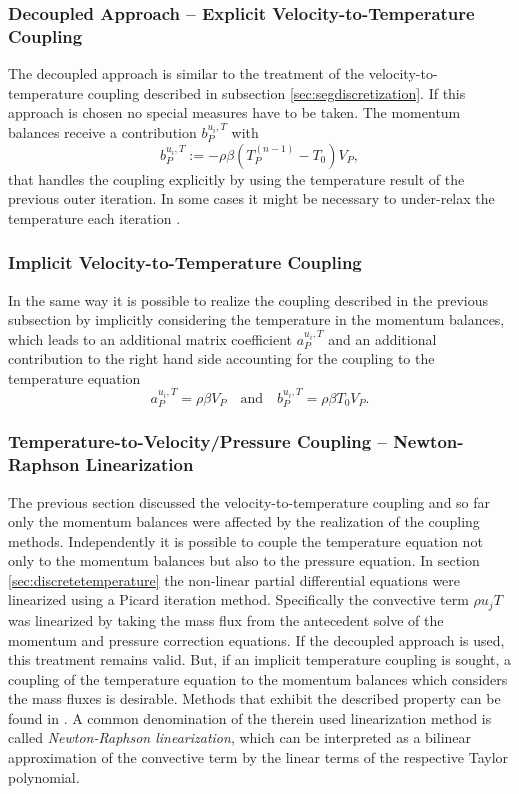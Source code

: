 \subsubsection{Decoupled Approach -- Explicit Velocity-to-Temperature Coupling}

The decoupled approach is similar to the treatment of the velocity-to-temperature coupling described in subsection \ref{sec:segdiscretization}. If this approach is chosen no special measures have to be taken. The momentum balances receive a contribution \( b_P^{u_i,T}\) with
\begin{displaymath}
  b_P^{u_i,T} := - \rho \beta \left( T_P^{(n-1)} - T_0 \right) V_P,
\end{displaymath}
that handles the coupling explicitly by using the temperature result of the previous outer iteration. In some cases it might be necessary to under-relax the temperature each iteration \cite{ferziger02}.

\subsubsection{Implicit Velocity-to-Temperature Coupling}

In the same way it is possible to realize the coupling described in the previous subsection by implicitly considering the temperature in the momentum balances, which leads to an additional matrix coefficient \(a_P^{u_i,T}\) and an additional contribution to the right hand side accounting for the coupling to the temperature equation
\begin{displaymath}
  a_P^{u_i,T} = \rho \beta V_P 
  \quad \text{and} \quad
  b_P^{u_i,T} = \rho \beta T_0 V_P.
\end{displaymath}

\subsubsection{Temperature-to-Velocity/Pressure Coupling -- Newton-Raphson Linearization}
\label{sec:nrcoupled}

The previous section discussed the velocity-to-temperature coupling and so far only the momentum balances were affected by the realization of the coupling methods. Independently it is possible to couple the temperature equation not only to the momentum balances but also to the pressure equation. In section \ref{sec:discretetemperature} the non-linear partial differential equations were linearized using a Picard iteration method. Specifically the convective term \(\rho u_j T\) was linearized by taking the mass flux from the antecedent solve of the momentum and pressure correction equations. If the decoupled approach is used, this treatment remains valid. But, if an implicit temperature coupling is sought, a coupling of the temperature equation to the momentum balances which considers the mass fluxes is desirable. Methods that exhibit the described property can be found in \cite{galpin86,oliveira01,sheu04,vakilipour12}. A common denomination of the therein used linearization method is called \emph{Newton-Raphson linearization}, which can be interpreted as a bilinear approximation of the convective term by the linear terms of the respective Taylor polynomial.

